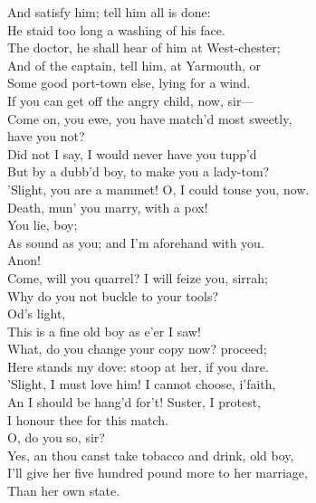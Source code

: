 \documentclass[a4paper,oneside]{memoir}
\begin{document}
\begin{drama*}
And satisfy him; tell him all is done:\\
He staid too long a washing of his face.\\
The doctor, he shall hear of him at West-chester;\\
And of the captain, tell him, at Yarmouth, or\\
Some good port-town else, lying for a wind.\\
If you can get off the angry child, now, sir---\\
\kastrilspeaks Come on, you ewe, you have match'd most sweetly,\\
have you not?\\
Did not I say, I would never have you tupp'd\\
But by a dubb'd boy, to make you a lady-tom?\\
'Slight, you are a mammet! O, I could touse you, now.\\
Death, mun' you marry, with a pox!\\
\lovewitspeaks {} You lie, boy;\\
As sound as you; and I'm aforehand with you.\\
\kastrilspeaks Anon!\\
\lovewitspeaks {} Come, will you quarrel? I will feize you, sirrah;\\
Why do you not buckle to your tools?\\
\kastrilspeaks {} Od's light,\\
This is a fine old boy as e'er I saw!\\
\lovewitspeaks What, do you change your copy now? proceed;\\
Here stands my dove: stoop at her, if you dare.\\
\kastrilspeaks 'Slight, I must love him! I cannot choose, i'faith,\\
An I should be hang'd for't! Suster, I protest,\\
I honour thee for this match.\\
\lovewitspeaks {} O, do you so, sir?\\
\kastrilspeaks Yes, an thou canst take tobacco and drink, old boy,\\
I'll give her five hundred pound more to her marriage,\\
Than her own state.\\

\end{drama*}
\end{document}

